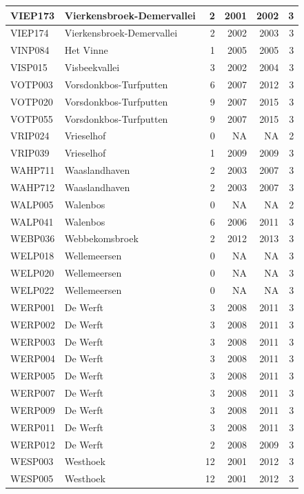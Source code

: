 \documentclass[11pt,]{book}
\begin{document}
\begin{table}
\begin{tabular}[t]{l|l|r|r|r|r}
\hline
VIEP173 & Vierkensbroek-Demervallei & 2 & 2001 & 2002 & 3\\
\hline
VIEP174 & Vierkensbroek-Demervallei & 2 & 2002 & 2003 & 3\\
\hline
VINP084 & Het Vinne & 1 & 2005 & 2005 & 3\\
\hline
VISP015 & Visbeekvallei & 3 & 2002 & 2004 & 3\\
\hline
VOTP003 & Vorsdonkbos-Turfputten & 6 & 2007 & 2012 & 3\\
\hline
VOTP020 & Vorsdonkbos-Turfputten & 9 & 2007 & 2015 & 3\\
\hline
VOTP055 & Vorsdonkbos-Turfputten & 9 & 2007 & 2015 & 3\\
\hline
VRIP024 & Vrieselhof & 0 & NA & NA & 2\\
\hline
VRIP039 & Vrieselhof & 1 & 2009 & 2009 & 3\\
\hline
WAHP711 & Waaslandhaven & 2 & 2003 & 2007 & 3\\
\hline
WAHP712 & Waaslandhaven & 2 & 2003 & 2007 & 3\\
\hline
WALP005 & Walenbos & 0 & NA & NA & 2\\
\hline
WALP041 & Walenbos & 6 & 2006 & 2011 & 3\\
\hline
WEBP036 & Webbekomsbroek & 2 & 2012 & 2013 & 3\\
\hline
WELP018 & Wellemeersen & 0 & NA & NA & 3\\
\hline
WELP020 & Wellemeersen & 0 & NA & NA & 3\\
\hline
WELP022 & Wellemeersen & 0 & NA & NA & 3\\
\hline
WERP001 & De Werft & 3 & 2008 & 2011 & 3\\
\hline
WERP002 & De Werft & 3 & 2008 & 2011 & 3\\
\hline
WERP003 & De Werft & 3 & 2008 & 2011 & 3\\
\hline
WERP004 & De Werft & 3 & 2008 & 2011 & 3\\
\hline
WERP005 & De Werft & 3 & 2008 & 2011 & 3\\
\hline
WERP007 & De Werft & 3 & 2008 & 2011 & 3\\
\hline
WERP009 & De Werft & 3 & 2008 & 2011 & 3\\
\hline
WERP011 & De Werft & 3 & 2008 & 2011 & 3\\
\hline
WERP012 & De Werft & 2 & 2008 & 2009 & 3\\
\hline
WESP003 & Westhoek & 12 & 2001 & 2012 & 3\\
\hline
WESP005 & Westhoek & 12 & 2001 & 2012 & 3\\

\end{tabular}
\end{table}
\end{document}
